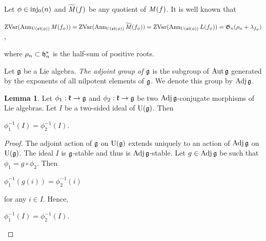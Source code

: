 \documentclass[10pt]{amsart}\oddsidemargin -1mm \evensidemargin -1mm \topmargin -15mm\headheight5mm \headsep 3.5mm \textheight 245mm\textwidth 170mm %
\theoremstyle{definition}\newtheorem{theorem}{Theorem}[section]\newtheorem{lemma}[theorem]{Lemma}\newtheorem{remark}[theorem]{Remark}\newtheorem{proposition}[theorem]{Proposition}\newtheorem{corollary}[theorem]{Corollary}\newtheorem{definition}[theorem]{Definition}\newtheorem{Ex}[theorem]{Example}
\newcounter{AP}
\begin{document}
Let $\phi\in\operatorname{\mathrm{inj_0}}(n)$ and
$\widetilde{\operatorname{{\it M}}}(f)$ be any quotient of $\operatorname{{\it M}}(f)$. It is well known
that\begin{center}$\operatorname{\mathrm{ZVar}}(\operatorname{\mathrm{Ann}}_{\operatorname{\mathrm{U}}(\frak{sl}(\phi))}
\operatorname{{\it M}}(f_\phi))=\operatorname{\mathrm{ZVar}}(\operatorname{\mathrm{Ann}}_{\operatorname{\mathrm{U}}(\frak{sl}(\phi))}\widetilde{\operatorname{{\it M}}}(f_\phi))=\operatorname{\mathrm{ZVar}}(\operatorname{\mathrm{Ann}}_{\operatorname{\mathrm{U}}(\frak{sl}(\phi))}L(f_\phi))=\frak
G_n(\rho_n+\lambda_{f_\phi})$,\end{center} where $\rho_n\subset\frak
h_n^*$ is the half-sum of positive roots. %

Let $\frak g$ be a Lie algebra. {\it The adjoint group of $\frak g$} is the subgroup of $\operatorname{\mathrm{Aut}}\frak g$ generated by the exponents of all nilpotent elements of $\frak g$. We denote this group by $\operatorname{\mathrm{Adj}}\frak g$.

\begin{lemma}\label{Lconj}Let $\phi_1: \frak k\to\frak g$ and $\phi_2: \frak k\to\frak g$ be two $\operatorname{\mathrm{Adj}}\frak g$-conjugate morphisms of Lie
algebras. Let $I$ be a two-sided ideal of $\operatorname{\mathrm{U}}(\frak g)$. Then
\begin{center}$\phi_1^{-1}(I)=\phi_2^{-1}(I)$.\end{center}\end{lemma}
\begin{proof}The adjoint action of $\frak g$ on $\operatorname{\mathrm{U}}(\frak g)$ extends
uniquely to an action of $\operatorname{\mathrm{Adj}}\frak g$ on $\operatorname{\mathrm{U}}(\frak g)$. The ideal
$I$ is $\frak g$-stable and thus is $\operatorname{\mathrm{Adj}}\frak g$-stable. Let $g\in
\operatorname{\mathrm{Adj}}\frak g$ be such that $\phi_1=g\circ\phi_2$.
Then\begin{center}$\phi_1^{-1}(g(i))=\phi_2^{-1}(i)$\end{center}for any $i\in I$. Hence,
\begin{center}$\phi_1^{-1}(I)=\phi_2^{-1}(I)$.\end{center}\end{proof}
\end{document}
